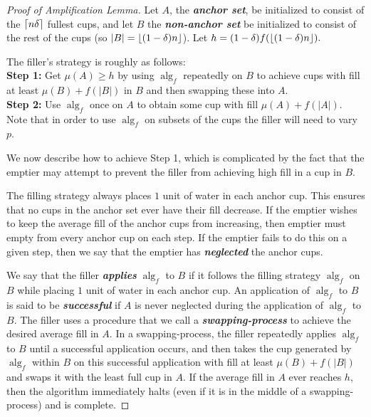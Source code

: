 \documentclass[twocolumn]{article}[10pt]
\newcommand{\defn}[1]{{\textit{\textbf{\boldmath #1}}}\xspace}
\DeclareMathOperator{\alg}{\text{alg}}
\DeclarePairedDelimiter\ceil{\lceil}{\rceil}
\DeclarePairedDelimiter\floor{\lfloor}{\rfloor}
\begin{document}
\begin{proof}[Proof of Amplification Lemma]

  Let $A$, the \defn{anchor set}, be initialized to consist of
  the $\ceil{n\delta}$ fullest cups, and let $B$ the \defn{non-anchor set} be initialized to consist
  of the rest of the cups (so $|B| = \floor{(1-\delta)n}$). Let $h =
  (1-\delta)f(\floor{(1-\delta)n}).$

  The filler's strategy is roughly as follows: \\
  \textbf{Step 1:} Get $\mu(A) \ge h$ by using $\alg_f$
  repeatedly on $B$ to achieve cups with fill at least $\mu(B) +
  f(|B|)$ in $B$ and then swapping these into $A$.\\
  \textbf{Step 2:} Use $\alg_f$ once on $A$ to obtain some cup
  with fill $\mu(A)+f(|A|)$.\\
  Note that in order to use $\alg_f$ on subsets of the cups the
  filler will need to vary $p$.

  We now describe how to achieve Step 1, which is
  complicated by the fact that the emptier may attempt to
  prevent the filler from achieving high fill in a cup
  in $B$.

  The filling strategy always places $1$ unit of water in each
  anchor cup. This ensures that no cups in the anchor set ever
  have their fill decrease. If the emptier wishes to keep the
  average fill of the anchor cups from increasing, then emptier
  must empty from every anchor cup on each step. If the emptier
  fails to do this on a given step, then we say that the emptier
  has \defn{neglected} the anchor cups. 

  We say that the filler \defn{applies} $\alg_f$ to $B$ if it
  follows the filling strategy $\alg_f$ on $B$ while placing $1$
  unit of water in each anchor cup. An application of $\alg_f$ to
  $B$ is said to be \defn{successful} if $A$ is never neglected
  during the application of $\alg_f$ to $B$. The filler uses a
  procedure that we call a \defn{swapping-process} to achieve the
  desired average fill in $A$. In a swapping-process, the filler
  repeatedly applies $\alg_f$ to $B$ until a successful
  application occurs, and then takes the cup generated by
  $\alg_f$ within $B$ on this successful application with fill at
  least $\mu(B) + f(|B|)$ and swaps it with the least full cup in
  $A$. If the average fill in $A$ ever reaches $h$, then the
  algorithm immediately halts (even if it is in the middle of a
  swapping-process) and is complete.
  

\end{proof}
\end{document}
